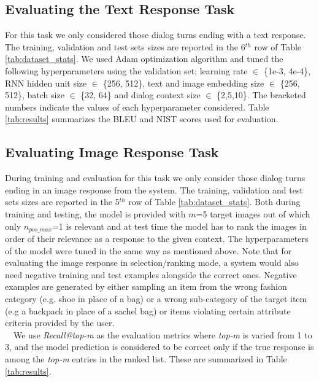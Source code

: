 \documentclass[letterpaper]{article} %
\begin{document}
\subsection{Evaluating the Text Response Task}
For this task we only considered those dialog turns ending with a text response. The training, validation and test sets sizes are reported in the 6$^{th}$ row of Table \ref{tab:dataset_stats}. We used Adam  optimization algorithm and tuned the following hyperparameters using the validation set; learning rate $\in$ \{1e-3, 4e-4\}, RNN hidden unit size $\in$ \{256, 512\}, text and image embedding size $\in$ \{256, 512\}, batch size $\in$ \{32, 64\} and dialog context size $\in$ \{2,5,10\}. The bracketed numbers indicate the values of each hyperparameter considered. Table \ref{tab:results} summarizes the BLEU and NIST %
scores used for evaluation.%

\subsection{Evaluating Image Response Task}

During training and evaluation for this task we only consider those dialog turns ending in an image response from the system. The training, validation and test sets sizes are reported in the 5$^{th}$ row of Table \ref{tab:dataset_stats}. Both during training and testing, the model is provided with $m$=5 target images out of which only $n_{pos\_max}$=1 is relevant and at test time the model has to rank the images in order of their relevance as a response to the given context. The hyperparameters of the model were tuned in the same way as mentioned above. Note that for evaluating the image response in selection/ranking mode, a system would also need negative training and test examples alongside the correct ones. Negative examples are generated by either sampling an item from the wrong fashion category (e.g. shoe in place of a bag) or a wrong sub-category of the target item (e.g a backpack in place of a sachel bag) or items violating certain attribute criteria provided by the user.
\\
\-\ \-\ We use \textit{Recall@top-m} as the evaluation metrics where \textit{top-m} is varied from 1 to 3, and the model prediction is considered to be correct only if the true response is among the \textit{top-m} entries in the ranked list. These are summarized in Table \ref{tab:results}.
\end{document}
